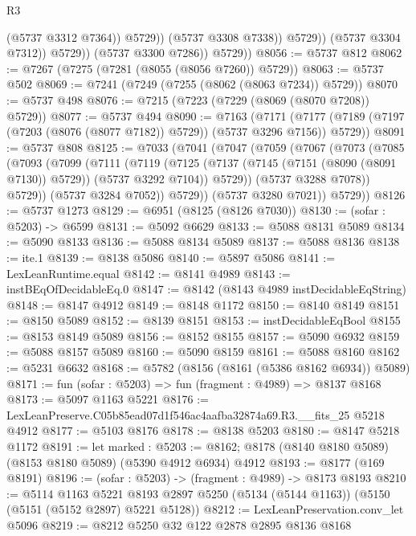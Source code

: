 \begin{lexlean}{R3}
\begin{coremodule}
                            (@5737 @3312 @7364))
                          @5729))
                      (@5737 @3308 @7338))
                    @5729))
                (@5737 @3304 @7312))
              @5729))
          (@5737 @3300 @7286))
        @5729))
@8056 := @5737 @812
@8062 := @7267 (@7275 (@7281 (@8055 (@8056 @7260)) @5729))
@8063 := @5737 @502
@8069 := @7241 (@7249 (@7255 (@8062 (@8063 @7234)) @5729))
@8070 := @5737 @498
@8076 := @7215 (@7223 (@7229 (@8069 (@8070 @7208)) @5729))
@8077 := @5737 @494
@8090 := @7163
    (@7171 (@7177 (@7189 (@7197 (@7203 (@8076 (@8077 @7182)) @5729)) (@5737 @3296 @7156)) @5729))
@8091 := @5737 @808
@8125 := @7033
    (@7041
      (@7047
        (@7059
          (@7067
            (@7073
              (@7085
                (@7093
                  (@7099
                    (@7111
                      (@7119
                        (@7125
                          (@7137 (@7145 (@7151 (@8090 (@8091 @7130)) @5729)) (@5737 @3292 @7104))
                          @5729))
                      (@5737 @3288 @7078))
                    @5729))
                (@5737 @3284 @7052))
              @5729))
          (@5737 @3280 @7021))
        @5729))
@8126 := @5737 @1273
@8129 := @6951 (@8125 (@8126 @7030))
@8130 := (sofar : @5203) -> @6599
@8131 := @5092 @6629
@8133 := @5088 @8131 @5089
@8134 := @5090 @8133
@8136 := @5088 @8134 @5089
@8137 := @5088 @8136
@8138 := ite.{1}
@8139 := @8138 @5086
@8140 := @5897 @5086
@8141 := LexLeanRuntime.equal
@8142 := @8141 @4989
@8143 := instBEqOfDecidableEq.{0}
@8147 := @8142 (@8143 @4989 instDecidableEqString)
@8148 := @8147 @4912
@8149 := @8148 @1172
@8150 := @8140 @8149
@8151 := @8150 @5089
@8152 := @8139 @8151
@8153 := instDecidableEqBool
@8155 := @8153 @8149 @5089
@8156 := @8152 @8155
@8157 := @5090 @6932
@8159 := @5088 @8157 @5089
@8160 := @5090 @8159
@8161 := @5088 @8160
@8162 := @5231 @6632
@8168 := @5782 (@8156 (@8161 (@5386 @8162 @6934)) @5089)
@8171 := fun (sofar : @5203) => fun (fragment : @4989) => @8137 @8168
@8173 := @5097 @1163 @5221
@8176 := LexLeanPreserve.C05b85ead07d1f546ac4aafba32874a69.R3.__fits_25 @5218 @4912
@8177 := @5103 @8176
@8178 := @8138 @5203
@8180 := @8147 @5218 @1172
@8191 := let marked : @5203 := @8162;
  @8178 (@8140 @8180 @5089) (@8153 @8180 @5089) (@5390 @4912 @6934) @4912
@8193 := @8177 (@169 @8191)
@8196 := (sofar : @5203) -> (fragment : @4989) -> @8173 @8193
@8210 := @5114
    @1163
    @5221
    @8193
    @2897
    @5250
    (@5134 (@5144 @1163))
    (@5150 (@5151 (@5152 @2897) @5221 @5128))
@8212 := LexLeanPreservation.conv_let @5096
@8219 := @8212 @5250 @32 @122 @2878 @2895 @8136 @8168

\end{coremodule}
\end{lexlean}
